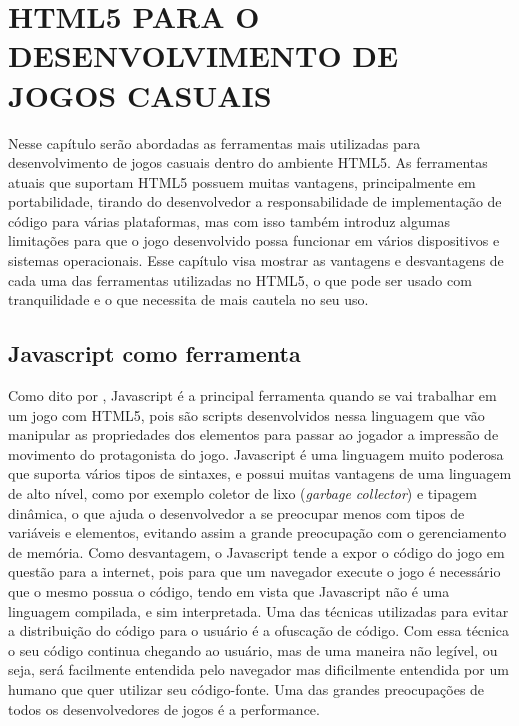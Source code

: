 \section[HTML5 para o desenvolvimento de jogos casuais]{HTML5 PARA O DESENVOLVIMENTO DE JOGOS CASUAIS}

Nesse capítulo serão abordadas as ferramentas mais utilizadas para
desenvolvimento de jogos casuais dentro do ambiente HTML5.
As ferramentas atuais que suportam HTML5 possuem muitas vantagens,
principalmente em portabilidade, tirando do desenvolvedor a
responsabilidade de implementação de código para várias plataformas, mas
com isso também introduz algumas limitações para que o jogo
desenvolvido possa funcionar em vários dispositivos e sistemas
operacionais. Esse capítulo visa mostrar as vantagens e desvantagens
de cada uma das ferramentas utilizadas no HTML5, o que pode ser usado
com tranquilidade e o que necessita de mais cautela no seu uso.

\subsection{Javascript como ferramenta}

Como dito por , Javascript é a principal ferramenta
quando se vai trabalhar em um jogo com HTML5, pois são scripts
desenvolvidos nessa linguagem que vão
manipular as propriedades dos elementos para passar ao jogador a
impressão de movimento do protagonista do jogo.
Javascript é uma linguagem muito poderosa que suporta vários tipos de
sintaxes, e possui muitas vantagens de uma linguagem de alto nível,
como por exemplo coletor de lixo (\textit{garbage collector}) e tipagem
dinâmica, o que ajuda o desenvolvedor a se preocupar menos com tipos
de variáveis e elementos, evitando assim a grande preocupação com o
gerenciamento de memória.
Como desvantagem, o Javascript tende a expor o código do jogo em
questão para a internet, pois para que um navegador execute o jogo é
necessário que o mesmo possua o código, tendo em vista que Javascript
não é uma linguagem compilada, e sim interpretada. Uma das técnicas
utilizadas para evitar a distribuição do código para o usuário é a
ofuscação de código. Com essa técnica o seu código continua chegando
ao usuário, mas de uma maneira não legível, ou seja, será facilmente
entendida pelo navegador mas dificilmente entendida por um humano que
quer utilizar seu código-fonte.
Uma das grandes preocupações de todos os desenvolvedores de jogos é a
performance.

